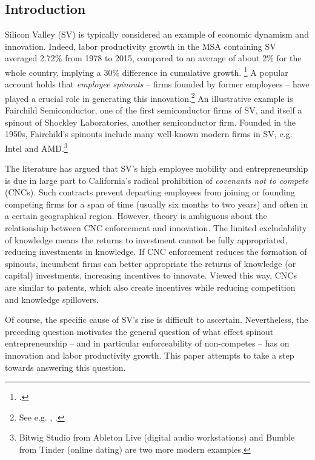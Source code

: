 \documentclass[11pt,english]{article}
\theoremstyle{remark}
\begin{document}
\subsection*{Introduction}

Silicon Valley (SV) is typically considered an example of economic dynamism and innovation. Indeed, labor productivity growth in the MSA containing SV averaged 2.72\% from 1978 to 2015, compared to an average of about 2\% for the whole country, implying a 30\% difference in cumulative growth. \footnote{\cite{parilla_understanding_2017}.} A popular account holds that \textit{employee spinouts} -- firms founded by former employees --  have played a crucial role in generating this innovation.\footnote{See e.g. \cite{saxenian_regional_1994}, \cite{franco_covenants_2008}.} An illustrative example is Fairchild Semiconductor, one of the first semiconductor firms of SV, and itself a spinout of Shockley Laboratories, another semiconductor firm. Founded in the 1950s, Fairchild's spinouts include many well-known modern firms in SV, e.g. Intel and AMD.\footnote{Bitwig Studio from Ableton Live (digital audio workstations) and Bumble from Tinder (online dating) are two more modern examples.}

The literature has argued that SV's high employee mobility and entrepreneurship is due in large part to California's radical prohibition of \textit{covenants not to compete } (CNCs). Such contracts prevent departing employees from joining or founding competing firms for a span of time (usually six months to two years) and often in a certain geographical region. However, theory is ambiguous about the relationship between CNC enforcement and innovation. The limited excludability of knowledge means the returns to investment cannot be fully appropriated, reducing investments in knowledge. If CNC enforcement reduces the formation of spinouts, incumbent firms can better appropriate the returns of knowledge (or capital) investments, increasing incentives to innovate. Viewed this way, CNCs are similar to patents, which also create incentives while reducing competition and knowledge spillovers.

Of course, the specific cause of SV's rise is difficult to ascertain. Nevertheless, the preceding question motivates the general question of what effect spinout entrepreneurship -- and in particular enforceability of non-competes -- has on innovation and labor productivity growth. This paper attempts to take a step towards answering this question.
\end{document}
